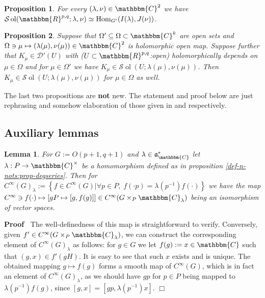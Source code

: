 \documentclass{article}
\newcommand{\assign}{:=}
\newcommand{\tmop}[1]{\ensuremath{\operatorname{#1}}}
\newcommand{\tmtextbf}[1]{{\bfseries{#1}}}
\newenvironment{proof}{\noindent\textbf{Proof\ }}{\hspace*{\fill}$\Box$\medskip}
\numberwithin{definition}{section}
\newtheorem{lemma}{Lemma}
\numberwithin{lemma}{section}
\newtheorem{proposition}{Proposition}
\numberwithin{proposition}{section}
{\theorembodyfont{\rmfamily}\newtheorem{remark}{Remark}
\numberwithin{remark}{section}
}
\begin{document}
\begin{proposition}
  \label{sol:prop-sol}For every $( \lambda, \nu) \in \mathbbm{C}^2$ we have
  $\mathcal{S} \tmop{ol} ( \mathbbm{R}^{p, q} ; \lambda, \nu) \simeq
  \tmop{Hom}_{G'} ( I ( \lambda), J ( \nu))$.
\end{proposition}

\begin{proposition}
  \label{sol:prop-holocont}Suppose that $\Omega' \subseteq \Omega \subset
  \mathbbm{C}^k$ are open sets and $\Omega \ni \mu \mapsto ( \lambda ( \mu),
  \nu ( \mu)) \in \mathbbm{C}^2$ is holomorphic open map. Suppose further that
  $K_{\mu} \in \mathcal{D}' ( U)$ with ($U \subset \mathbbm{R}^{p, q}$:open)
  holomorphically depends on $\mu \in \Omega$ and for $\mu \in \Omega'$ we
  have $K_{\mu} \in \mathcal{S} \tmop{ol} ( U ; \lambda ( \mu), \nu ( \mu))$.
  Then $K_{\mu} \in \mathcal{S} \tmop{ol} ( U ; \lambda ( \mu), \nu ( \mu))$
  for $\mu \in \Omega$ as well.
\end{proposition}

\begin{remark}
  The last two propositions are \tmtextbf{not} new. The statement and proof
  below are just rephrasing and somehow elaboration of those given in
  {\cite[thm 3.16]{kobayashi2015symmetry}} and {\cite[prop.
  3.18]{kobayashi2015symmetry}} respectively.
\end{remark}

\subsection{Auxiliary lemmas}

\begin{lemma}
  \label{sol:lem-unfold}For $G \assign O ( p + 1, q + 1)$ and $\lambda \in
  \mathfrak{a}_{\mathbbm{C}}^{\ast}$ let $\lambda : P \rightarrow
  \mathbbm{C}^{\times}$ be a homomorphism defined as in proposition
  \ref{def-n-nots:prop-degseries}. Then for $C^{\infty} ( G)_{\lambda} \assign
  \left\{ f \in C^{\infty} ( G) | \forall p \in P, \; f ( \cdot p) = \lambda (
  p^{- 1}) f ( \cdot) \right\}$ we have the map $C^{\infty} \ni f ( \cdot)
  \mapsto [ g P \mapsto [ g, f ( g)]] \in C^{\infty} ( G \times_P
  \mathbbm{C}_{\lambda})$ being an isomorphism of vector spaces.
\end{lemma}

\begin{proof}
  The well-definedness of this map is straightforward to verify. Conversely,
  given $f' \in C^{\infty} ( G \times_P \mathbbm{C}_{\lambda})$, we can
  construct the corresponding element of $C^{\infty} ( G)_{\lambda}$ as
  follows: for $g \in G$ we let $f ( g) \assign x \in \mathbbm{C}$ such that
  $( g, x) \in f' ( g H)$. It is easy to see that such $x$ exists and is
  unique. The obtained mapping $g \mapsto f ( g)$ forms a smooth map of
  $C^{\infty} ( G)$, which is in fact an element of $C^{\infty} (
  G)_{\lambda}$, as we should have $g p$ for $p \in P$ being mapped to
  $\lambda ( p^{- 1}) f ( g)$, since $[ g, x] = [ g p, \lambda ( p^{- 1}) x]$.
\end{proof}
\end{document}

